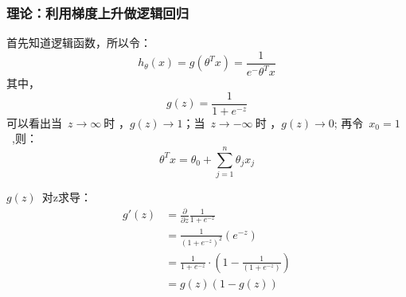 \subsubsection{理论：利用梯度上升做逻辑回归}
首先知道逻辑函数，所以令：
$$h_\theta(x)=g(\theta^T x)=\frac{1}{e^-\theta^Tx}$$
其中，
$$g(z)=\frac{1}{1+e^{-z}}$$
可以看出当~$z\rightarrow\infty~$时 ，$g(z)\rightarrow1$；当~$z\rightarrow-\infty~$时 ，$g(z)\rightarrow0$;
再令~$x_0=1$~,则：
$$\theta^Tx=\theta_0+\sum_{j=1}^{n}\theta_jx_j$$

$g(z)$~对z求导：
\begin{equation}
\begin{split}
  g'(z) &= \frac{\partial}{\partial z}\frac{1}{1+e^{-z}}\\
        &= \frac{1}{(1+e^{-z})^2}(e^{-z})\\
        &= \frac{1}{1+e^{-z}}\cdot(1-\frac{1}{(1+e^{-z})})\\
        &= g(z)(1-g(z))
\end{split}
\end{equation}

